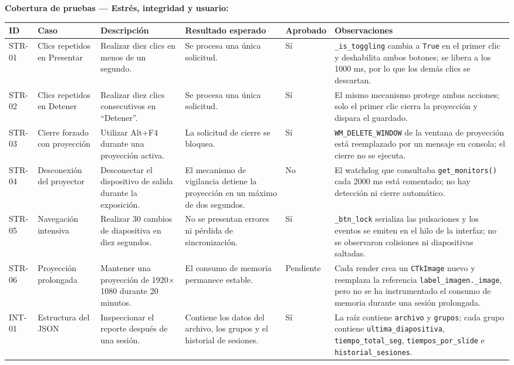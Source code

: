 \documentclass[12pt,letterpaper]{article}
\begin{document}
\textbf{Cobertura de pruebas --- Estrés, integridad y usuario:}

{\tiny
\renewcommand{\arraystretch}{1.15}
\begin{longtable}{|L{1.1cm}|L{2.3cm}|L{3.2cm}|L{3.6cm}|L{1.2cm}|L{3.6cm}|}
\hline
\textbf{ID} & \textbf{Caso} & \textbf{Descripción} & \textbf{Resultado esperado} & \textbf{Aprobado} & \textbf{Observaciones} \\ \hline
\endhead
STR-01 & Clics repetidos en Presentar & Realizar diez clics en menos de un segundo. & Se procesa una única solicitud. & Sí & \texttt{\_is\_toggling} cambia a \texttt{True} en el primer clic y deshabilita ambos botones; se libera a los 1000 ms, por lo que los demás clics se descartan. \\ \hline
STR-02 & Clics repetidos en Detener & Realizar diez clics consecutivos en ``Detener''. & Se procesa una única solicitud. & Sí & El mismo mecanismo protege ambas acciones; solo el primer clic cierra la proyección y dispara el guardado. \\ \hline
STR-03 & Cierre forzado con proyección & Utilizar Alt+F4 durante una proyección activa. & La solicitud de cierre se bloquea. & Sí & \texttt{WM\_DELETE\_WINDOW} de la ventana de proyección está reemplazado por un mensaje en consola; el cierre no se ejecuta. \\ \hline
STR-04 & Desconexión del proyector & Desconectar el dispositivo de salida durante la exposición. & El mecanismo de vigilancia detiene la proyección en un máximo de dos segundos. & No & El watchdog que consultaba \texttt{get\_monitors()} cada 2000 ms está comentado; no hay detección ni cierre automático. \\ \hline
STR-05 & Navegación intensiva & Realizar 30 cambios de diapositiva en diez segundos. & No se presentan errores ni pérdida de sincronización. & Sí & \texttt{\_btn\_lock} serializa las pulsaciones y los eventos se emiten en el hilo de la interfaz; no se observaron colisiones ni diapositivas saltadas. \\ \hline
STR-06 & Proyección prolongada & Mantener una proyección de 1920$\times$1080 durante 20 minutos. & El consumo de memoria permanece estable. & Pendiente & Cada render crea un \texttt{CTkImage} nuevo y reemplaza la referencia \texttt{label\_imagen.\_image}, pero no se ha instrumentado el consumo de memoria durante una sesión prolongada. \\ \hline
INT-01 & Estructura del JSON & Inspeccionar el reporte después de una sesión. & Contiene los datos del archivo, los grupos y el historial de sesiones. & Sí & La raíz contiene \texttt{archivo} y \texttt{grupos}; cada grupo contiene \texttt{ultima\_diapositiva}, \texttt{tiempo\_total\_seg}, \texttt{tiempos\_por\_slide} e \texttt{historial\_sesiones}. \\ \hline

\end{longtable}}
\end{document}
